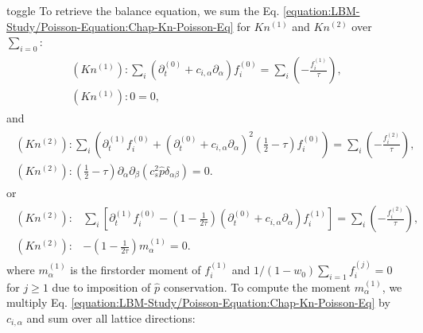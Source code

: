 \documentclass[letterpaper,10pt,english,openany,oneside]{jupyterBook}
\begin{document}
\begin{sphinxuseclass}{toggle}
\sphinxAtStartPar
To retrieve the balance equation, we sum the Eq. \eqref{equation:LBM-Study/Poisson-Equation:Chap-Kn-Poisson-Eq} for \(Kn^{(1)}\) and \(Kn^{(2)}\) over \(\sum_{i=0} \):
\begin{equation*}
\begin{split}
\begin{array}{l}
(Kn^{(1)}): \displaystyle\sum_{i}\left( \partial_{t}^{(0)} + c_{i,\alpha}\partial_{\alpha} \right)f_{i}^{(0)}= \displaystyle\sum_{i} \left(- \displaystyle\frac{ f_{i}^{(1)} }{ \tau } \right),\\
(Kn^{(1)}): 0  =0,
\end{array}
\end{split}
\end{equation*}
\sphinxAtStartPar
and
\begin{equation*}
\begin{split}
\begin{array}{l}
(Kn^{(2)}): \displaystyle\sum_{i}\left( \partial_{t}^{(1)} f_{i}^{(0)} + \left( \partial_{t}^{(0)} + c_{i,\alpha}\partial_{\alpha} \right)^{2} \displaystyle\left( \frac{1}{2}-\tau\right) f_{i}^{(0)} \right) =  \displaystyle\sum_{i}\left( - \displaystyle\frac{ f_{i}^{(2)} }{ \tau } \right), \\
(Kn^{(2)}): \left( \displaystyle\frac{1}{2}-\tau\right) \partial_{\alpha}\partial_{\beta} \left(c_{s}^{2} \widehat{p} \delta_{\alpha\beta} \right) =0. 
\end{array}
\end{split}
\end{equation*}
\sphinxAtStartPar
or
\begin{equation}\label{equation:LBM-Study/Poisson-Equation:Kn1-0-B0}
\begin{split}
\begin{array}{ll}
(Kn^{(2)}):& \displaystyle\sum_{i}\left[ \partial_{t}^{(1)} f_{i}^{(0)} - \left(1-\displaystyle\frac{1}{2\tau}\right)\left( \partial_{t}^{(0)} + c_{i,\alpha}\partial_{\alpha} \right) f_{i}^{(1)}   \right]=  \displaystyle\sum_{i}\left( - \displaystyle\frac{f_{i}^{(2)}}{\tau} \right), \nonumber \\
(Kn^{(2)}):& - \left(1-\displaystyle\frac{1}{2\tau}\right) m^{(1)}_{\alpha} = 0.
\end{array}
\end{split}
\end{equation}
\sphinxAtStartPar
where \(m^{(1)}_{\alpha}\) is the first\sphinxhyphen{}order moment of \(f_{i}^{(1)}\) and \(1/(1-w_{0})\sum_{i=1}f_{i}^{(j)}=0\) for \(j\geq 1\) due to imposition of \(\widehat{p}\) conservation. To compute the moment \(m^{(1)}_{\alpha}\), we multiply Eq. \eqref{equation:LBM-Study/Poisson-Equation:Chap-Kn-Poisson-Eq} by \(c_{i,\alpha}\) and sum over all lattice directions:

\end{sphinxuseclass}
\end{document}
